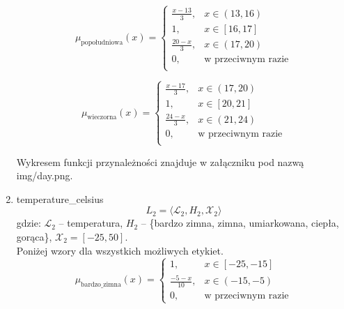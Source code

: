 \documentclass{article}
\begin{document}
\begin{enumerate}
        \begin{equation}
            \mu_{\text{popołudniowa}}(x) =
            \begin{cases}
            \frac{x - 13}{3}, & x \in (13, 16) \\
            1, & x \in [16, 17] \\
            \frac{20 - x}{3}, & x \in (17, 20) \\
            0, & \text{w przeciwnym razie} \\
             \end{cases}
        \end{equation}

        \begin{equation}
            \mu_{\text{wieczorna}}(x) =
            \begin{cases}
            \frac{x - 17}{3}, & x \in (17, 20) \\
            1, & x \in [20, 21] \\
            \frac{24 - x}{3}, & x \in (21, 24) \\
            0, & \text{w przeciwnym razie} \\
            \end{cases}
        \end{equation} 
        
Wykresem funkcji przynależności znajduje w załączniku pod nazwą img/day.png.
    
    \item temperature\_celsius
        \begin{equation}
            L_2 = \langle \mathcal{L}_2, H_2, \mathcal{X}_2 \rangle
        \end{equation}
        gdzie: $\mathcal{L}_2$ – temperatura, $H_2$ – \{bardzo zimna, zimna, umiarkowana, ciepła, gorąca\}, $\mathcal{X}_2 = [-25, 50]$. \\
        Poniżej wzory dla wszystkich możliwych etykiet.
                \begin{equation}
                   \mu_{\text{bardzo\_zimna}}(x) =
                    \begin{cases}
                    1, & x \in [-25, -15] \\
                    \frac{-5 - x}{10}, & x \in (-15, -5) \\
                    0, & \text{w przeciwnym razie}
                    \end{cases}
                \end{equation}
                

\end{enumerate}
\end{document}
